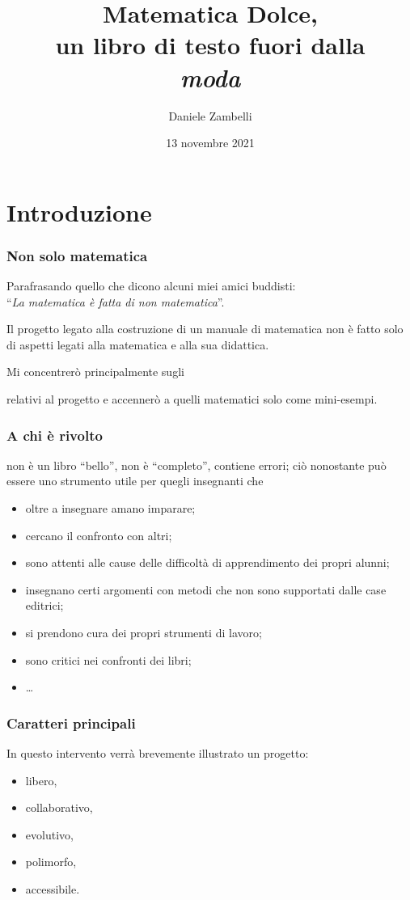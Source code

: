 \documentclass{beamer} %
\title{Matematica Dolce,\\ 
un libro di testo fuori dalla \\
\emph{moda}}
\date{13 novembre 2021}
\author{Daniele Zambelli
}
\begin{document}
\initslides

\section{Introduzione}

\begin{frame}\frametitle{Non solo matematica}

\begin{flushright}
Parafrasando quello che dicono alcuni miei amici buddisti: \\
``\emph{La matematica è fatta di non matematica}''.
\end{flushright}

Il progetto legato alla costruzione di un manuale di matematica non è 
fatto solo di aspetti legati alla matematica e alla sua didattica. 

\bigskip
\pause
Mi concentrerò principalmente sugli 
\begin{center} \end{center}
relativi al progetto  e accennerò a quelli 
matematici solo come mini-esempi.

\end{frame}


\begin{frame}\frametitle{A chi è rivolto}

\md non è un libro ``bello'', non è ``completo'', contiene errori;
ciò nonostante può essere uno strumento utile per quegli insegnanti che

\bigskip
\begin{itemize} [<+->]
\item oltre a insegnare amano imparare;
\item cercano il confronto con altri;
\item sono attenti alle cause delle difficoltà di apprendimento dei propri 
alunni;
\item insegnano certi argomenti con metodi che non sono supportati dalle case 
editrici;
\item si prendono cura dei propri strumenti di lavoro;
\item sono critici nei confronti dei libri;
\item \dots
\end{itemize}

\end{frame}


\begin{frame}\frametitle{Caratteri principali}

In questo intervento verrà brevemente illustrato un progetto:

\bigskip
\begin{itemize}  %
\item libero,
\item collaborativo,
\item evolutivo,
\item polimorfo,
\item accessibile.
\end{itemize}

\end{frame}
\end{document}
